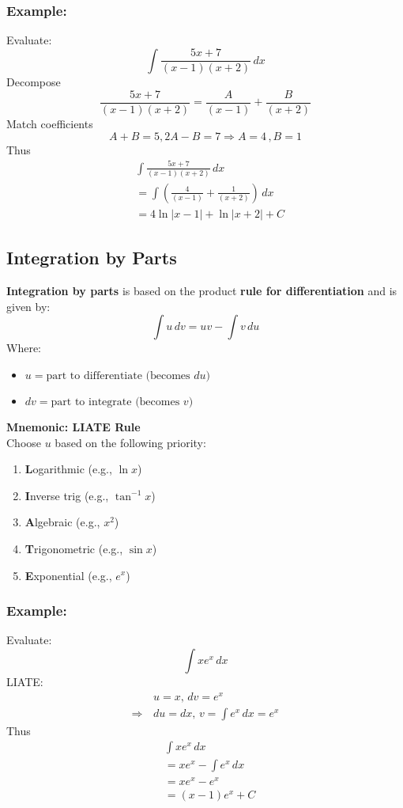 \documentclass[11pt]{article}
\begin{document}
\subsubsection*{Example:}
Evaluate:
\[
    \int \frac{5x+7}{(x-1)(x+2)}\,dx
\]
Decompose
\[
    \frac{5x+7}{(x-1)(x+2)}=\frac{A}{(x-1)}+\frac{B}{(x+2)}
\]
Match coefficients
\[
    A+B=5, 2A-B=7\Rightarrow A=4\,,B=1
\]
Thus
\[
    \begin{aligned}
        &\int \frac{5x+7}{(x-1)(x+2)}\,dx\\[.5em]
        &=\int\left(\frac{4}{(x-1)}+\frac{1}{(x+2)}\right)\,dx\\[.5em]
        &=4\ln|x-1|+\ln|x+2|+C
    \end{aligned}
\]
\subsection{Integration by Parts}
\textbf{Integration by parts} is based on the product \textbf{rule for differentiation} and is given by:
\[
  \boxed{
    \int u \, dv = uv - \int v \, du
  }
\]
Where:
\begin{itemize}
    \item $u = \text{part to differentiate (becomes } du)$
    \item $dv = \text{part to integrate (becomes } v)$
\end{itemize}\textbf{Mnemonic: LIATE Rule}\\
\noindent Choose $u$ based on the following priority:
\begin{enumerate}
    \item \textbf{L}ogarithmic (e.g., $\ln x$)
    \item \textbf{I}nverse trig (e.g., $\tan^{-1} x$)
    \item \textbf{A}lgebraic (e.g., $x^2$)
    \item \textbf{T}rigonometric (e.g., $\sin x$)
    \item \textbf{E}xponential (e.g., $e^x$)
\end{enumerate}
\subsubsection*{Example:}
Evaluate:
\[
    \int xe^x\,dx
\]
LIATE: 
\[
    \begin{aligned}
        &u=x,\,dv=e^x\\
        \Rightarrow\, &du=dx,\,v=\int e^x\,dx=e^x
    \end{aligned}
\]
Thus
\[
    \begin{aligned}
        &\int xe^x\,dx\\[.5em]
        &=xe^x - \int e^x\,dx\\[.5em]
        &=xe^x - e^x\\[.5em]
        &=(x-1)e^x+C
    \end{aligned}
\]
\end{document}
